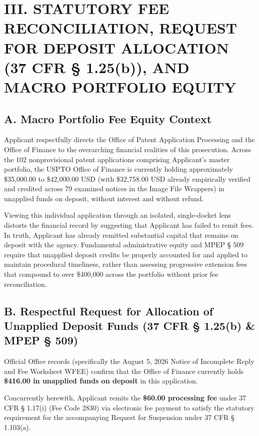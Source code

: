 \documentclass[11pt,letterpaper]{article}
\begin{document}
\section*{III. STATUTORY FEE RECONCILIATION, REQUEST FOR DEPOSIT ALLOCATION (37 CFR \S{} 1.25(b)), AND MACRO PORTFOLIO EQUITY}

\subsection*{A. Macro Portfolio Fee Equity Context}
Applicant respectfully directs the Office of Patent Application Processing and the Office of Finance to the overarching financial realities of this prosecution. Across the 102 nonprovisional patent applications comprising Applicant's master portfolio, the USPTO Office of Finance is currently holding approximately \$35,000.00 to \$42,000.00 USD (with \$32,758.00 USD already empirically verified and credited across 79 examined notices in the Image File Wrappers) in unapplied funds on deposit, without interest and without refund.

Viewing this individual application through an isolated, single-docket lens distorts the financial record by suggesting that Applicant has failed to remit fees. In truth, Applicant has already remitted substantial capital that remains on deposit with the agency. Fundamental administrative equity and MPEP \S{} 509 require that unapplied deposit credits be properly accounted for and applied to maintain procedural timeliness, rather than assessing progressive extension fees that compound to over \$400,000 across the portfolio without prior fee reconciliation.

\subsection*{B. Respectful Request for Allocation of Unapplied Deposit Funds (37 CFR \S{} 1.25(b) \& MPEP \S{} 509)}
Official Office records (specifically the August 5, 2026 Notice of Incomplete Reply and Fee Worksheet WFEE) confirm that the Office of Finance currently holds \textbf{\$416.00 in unapplied funds on deposit} in this application.

Concurrently herewith, Applicant remits the \textbf{\$60.00 processing fee} under 37 CFR \S{} 1.17(i) (Fee Code 2830) via electronic fee payment to satisfy the statutory requirement for the accompanying Request for Suspension under 37 CFR \S{} 1.103(a).
\end{document}
